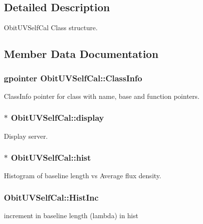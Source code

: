 \subsection{Detailed Description}
Obit\-UVSelf\-Cal Class structure. 



\subsection{Member Data Documentation}
\subsubsection{\setlength{\rightskip}{0pt plus 5cm}gpointer {\bf Obit\-UVSelf\-Cal::Class\-Info}}\label{structObitUVSelfCal_o1}


Class\-Info pointer for class with name, base and function pointers. 

\subsubsection{$\ast$ {\bf Obit\-UVSelf\-Cal::display}}\label{structObitUVSelfCal_o8}


Display server. 

\subsubsection{$\ast$ {\bf Obit\-UVSelf\-Cal::hist}}\label{structObitUVSelfCal_o13}


Histogram of baseline length vs Average flux density. 

\subsubsection{ {\bf Obit\-UVSelf\-Cal::Hist\-Inc}}\label{structObitUVSelfCal_o12}


increment in baseline length (lambda) in hist 

